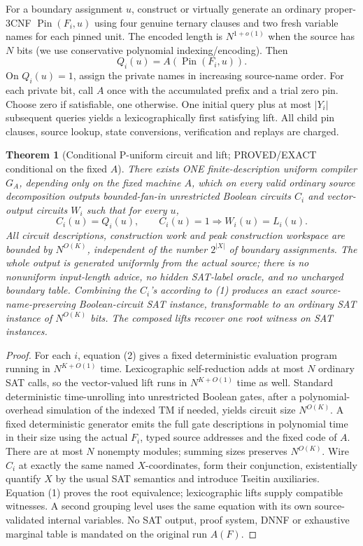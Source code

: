 \documentclass[11pt]{article}
\newtheorem{theorem}{Theorem}
\begin{document}
For a boundary assignment \(u\), construct or virtually generate an ordinary proper-3CNF \(\operatorname{Pin}(F_i,u)\) using four genuine ternary clauses and two fresh variable names for each pinned unit. The encoded length is \(N^{1+o(1)}\) when the source has \(N\) bits (we use conservative polynomial indexing/encoding). Then
\[
Q_i(u)=A(\operatorname{Pin}(F_i,u)).
\tag{2}
\]
On \(Q_i(u)=1\), assign the private names in increasing source-name order. For each private bit, call \(A\) once with the accumulated prefix and a trial zero pin. Choose zero if satisfiable, one otherwise. One initial query plus at most \(|Y_i|\) subsequent queries yields a lexicographically first satisfying lift. All child pin clauses, source lookup, state conversions, verification and replays are charged.

\begin{theorem}[Conditional P-uniform circuit and lift; PROVED/EXACT conditional on the fixed \(A\)]
There exists ONE finite-description uniform compiler \(G_A\), depending only on the fixed machine \(A\), which on every valid ordinary source decomposition outputs bounded-fan-in unrestricted Boolean circuits \(C_i\) and vector-output circuits \(W_i\) such that for every \(u\),
\[
C_i(u)=Q_i(u),\qquad
C_i(u)=1\Rightarrow W_i(u)=L_i(u).
\]
All circuit descriptions, construction work and peak construction workspace are bounded by \(N^{O(K)}\), independent of the number \(2^{|X|}\) of boundary assignments. The whole output is generated uniformly from the actual source; there is no nonuniform input-length advice, no hidden SAT-label oracle, and no uncharged boundary table. Combining the \(C_i\)'s according to (1) produces an exact source-name-preserving Boolean-circuit SAT instance, transformable to an ordinary SAT instance of \(N^{O(K)}\) bits. The composed lifts recover one root witness on SAT instances.
\end{theorem}
\begin{proof}
For each \(i\), equation (2) gives a fixed deterministic evaluation program running in \(N^{K+O(1)}\) time. Lexicographic self-reduction adds at most \(N\) ordinary SAT calls, so the vector-valued lift runs in \(N^{K+O(1)}\) time as well. Standard deterministic time-unrolling into unrestricted Boolean gates, after a polynomial-overhead simulation of the indexed TM if needed, yields circuit size \(N^{O(K)}\). A fixed deterministic generator emits the full gate descriptions in polynomial time in their size using the actual \(F_i\), typed source addresses and the fixed code of \(A\). There are at most \(N\) nonempty modules; summing sizes preserves \(N^{O(K)}\). Wire \(C_i\) at exactly the same named \(X\)-coordinates, form their conjunction, existentially quantify \(X\) by the usual SAT semantics and introduce Tseitin auxiliaries. Equation (1) proves the root equivalence; lexicographic lifts supply compatible witnesses. A second grouping level uses the same equation with its own source-validated internal variables. No SAT output, proof system, DNNF or exhaustive marginal table is mandated on the original run \(A(F)\).
\end{proof}
\end{document}
